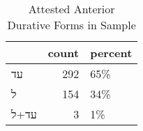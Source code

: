 \begin{table}[htbp!]
\centering
\caption{Attested Anterior Durative Forms in Sample}
\label{table:antdur_front}
\begin{tabular}{lrl}
\toprule
{} &  count & percent \\
\midrule
\texthebrew{עד}   &    292 &     65\% \\
\texthebrew{ל}    &    154 &     34\% \\
\texthebrew{עד+ל} &      3 &      1\% \\
\bottomrule
\end{tabular}
\end{table}
